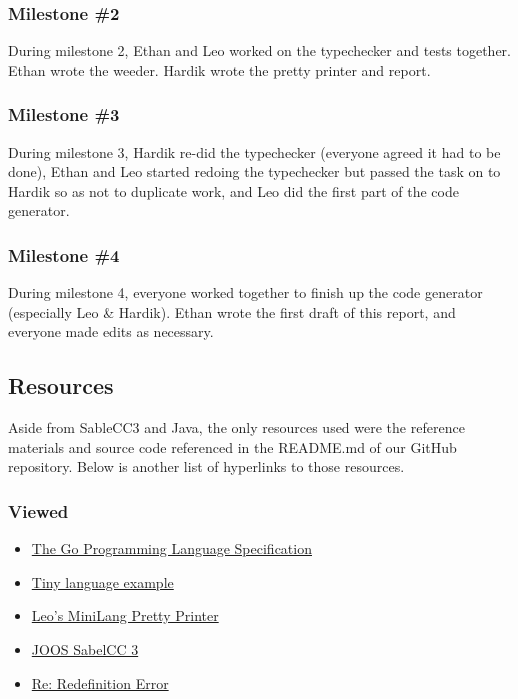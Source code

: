 \documentclass{article}
\begin{document}
\subsubsection{Milestone \#2}
During milestone 2, Ethan and Leo worked on the typechecker and tests together. Ethan wrote the weeder. Hardik wrote the pretty printer and report. 

\subsubsection{Milestone \#3}
During milestone 3, Hardik re-did the typechecker (everyone agreed it had to be done), Ethan and Leo started redoing the typechecker but passed the task on to Hardik so as not to duplicate work, and Leo did the first part of the code generator. 

\subsubsection{Milestone \#4}
During milestone 4, everyone worked together to finish up the code generator (especially Leo \& Hardik). Ethan wrote the first draft of this report, and everyone made edits as necessary.


\subsection{Resources}
Aside from SableCC3 and Java, the only resources used were the reference materials and source code referenced in the README.md of our GitHub repository. Below is another list of hyperlinks to those resources.

\subsubsection{Viewed}
\begin{itemize}
\item \href{https://golang.org/ref/spec}{The Go Programming Language Specification}
\item \href{http://www.sable.mcgill.ca/~hendren/520/2016/tiny/}{Tiny language example}
\item \href{https://github.com/leo-teng-long/minipart2/blob/master/src/mini/PrettyPrinter.java}{Leo's MiniLang Pretty Printer}
\item \href{http://www.sable.mcgill.ca/~hendren/520/2016/joos/jjoos-scc-3/}{JOOS SabelCC 3}
\item \href{http://www.sable.mcgill.ca/listarchives/sablecc-list/msg00639.html}{Re: Redefinition Error}
\end{itemize}
\end{document}
